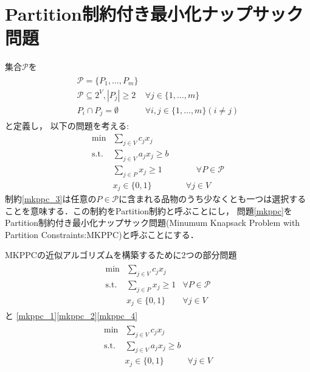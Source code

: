 \documentclass[twocolumn,10pt,dvipdfmx]{jarticle}
\numberwithin{equation}{section}
\begin{document}
\section{Partition制約付き最小化ナップサック問題}
	集合$\mathcal{P}$を
	\begin{align}
		\begin{array}{ll}
			\mathcal{P} = \{P_1,\dotsc,P_m\} & \\ 
			\mathcal{P}\subseteq 2^V, |P_j|\ge 2 & \forall j\in\{1,\dotsc,m\}\\
			P_i\cap P_j = \emptyset & \forall i,j \in \{1,\dotsc,m\}(i\neq j)
		\end{array}
	\end{align}
	と定義し，
	以下の問題を考える: 
	\begin{subequations}
		\begin{align}
				\mathrm{min } & \displaystyle\sum_{j\in V}{c_jx_j}\label{mkppc_1}\\
				\mathrm{s.t.} & \displaystyle\sum_{j\in V}{a_jx_j}\ge b\label{mkppc_2}\\
							& \displaystyle\sum_{j\in P}{x_j}\ge 1 \qquad\qquad \forall P\in \mathcal{P}\label{mkppc_3}\\
							& x_j \in \{0,1\} \qquad\qquad \forall j\in V\label{mkppc_4}
		\end{align}\label{mkppc}
	\end{subequations}
	制約\eqref{mkppc_3}は任意の$P\in\mathcal{P}$に含まれる品物のうち少なくとも一つは選択することを意味する．この制約をPartition制約と呼ぶことにし，
	問題\eqref{mkppc}をPartition制約付き最小化ナップサック問題(Minumum Knapsack Problem with Partition Constraints:MKPPC)と呼ぶことにする．\par
	MKPPCの近似アルゴリズムを構築するために2つの部分問題
    \begin{align}
        \begin{array}{cll}
            \mathrm{min } & \displaystyle\sum_{j\in V}{c_jx_j}\\
            \mathrm{s.t.} & \displaystyle\sum_{j\in P}{x_j}\ge 1 & \forall P\in \mathcal{P}\\
                        & x_j \in \{0,1\} & \forall j\in V
        \end{array}
        \label{pc}
    \end{align}
    と\color{white} \eqref{mkppc_1}\eqref{mkppc_2}\eqref{mkppc_4}\color{black}
    \begin{align}
        \begin{array}{cll}
            \mathrm{min } & \displaystyle\sum_{j\in V}{c_jx_j} &\\
            \mathrm{s.t.} & \displaystyle\sum_{j\in V}{a_jx_j}\ge b & \\
                    & x_j \in \{0,1\} & \forall j\in V 
        \end{array}
        \label{mkp}
    \end{align}
\end{document}
